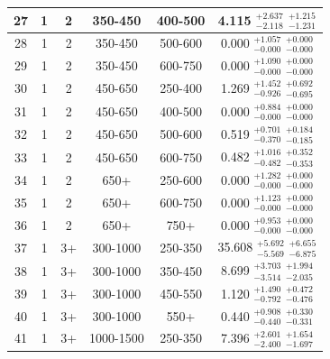\begin{table}[htbp]
\begin{centering}
\begin{tabular}{|c|c|c|c|c||c|}
\hline
27 &               1 &               2 &         350-450 &         400-500 & 4.115 $^{+2.637}_{-2.118}$ $^{+1.215}_{-1.231}$ \\ 
\hline
28 &               1 &               2 &         350-450 &         500-600 & 0.000 $^{+1.057}_{-0.000}$ $^{+0.000}_{-0.000}$ \\ 
\hline
29 &               1 &               2 &         350-450 &         600-750 & 0.000 $^{+1.090}_{-0.000}$ $^{+0.000}_{-0.000}$ \\ 
\hline
30 &               1 &               2 &         450-650 &         250-400 & 1.269 $^{+1.452}_{-0.926}$ $^{+0.692}_{-0.695}$ \\ 
\hline
31 &               1 &               2 &         450-650 &         400-500 & 0.000 $^{+0.884}_{-0.000}$ $^{+0.000}_{-0.000}$ \\ 
\hline
32 &               1 &               2 &         450-650 &         500-600 & 0.519 $^{+0.701}_{-0.370}$ $^{+0.184}_{-0.185}$ \\ 
\hline
33 &               1 &               2 &         450-650 &         600-750 & 0.482 $^{+1.016}_{-0.482}$ $^{+0.352}_{-0.353}$ \\ 
\hline
34 &               1 &               2 &            650+ &         250-600 & 0.000 $^{+1.282}_{-0.000}$ $^{+0.000}_{-0.000}$ \\ 
\hline
35 &               1 &               2 &            650+ &         600-750 & 0.000 $^{+1.123}_{-0.000}$ $^{+0.000}_{-0.000}$ \\ 
\hline
36 &               1 &               2 &            650+ &            750+ & 0.000 $^{+0.953}_{-0.000}$ $^{+0.000}_{-0.000}$ \\ 
\hline
37 &               1 &              3+ &        300-1000 &         250-350 & 35.608 $^{+5.692}_{-5.569}$ $^{+6.655}_{-6.875}$ \\ 
\hline
38 &               1 &              3+ &        300-1000 &         350-450 & 8.699 $^{+3.703}_{-3.514}$ $^{+1.994}_{-2.035}$ \\ 
\hline
39 &               1 &              3+ &        300-1000 &         450-550 & 1.120 $^{+1.490}_{-0.792}$ $^{+0.472}_{-0.476}$ \\ 
\hline
40 &               1 &              3+ &        300-1000 &            550+ & 0.440 $^{+0.908}_{-0.440}$ $^{+0.330}_{-0.331}$ \\ 
\hline
41 &               1 &              3+ &       1000-1500 &         250-350 & 7.396 $^{+2.601}_{-2.400}$ $^{+1.654}_{-1.697}$ \\ 

\end{tabular}
\end{centering}
\end{table}
